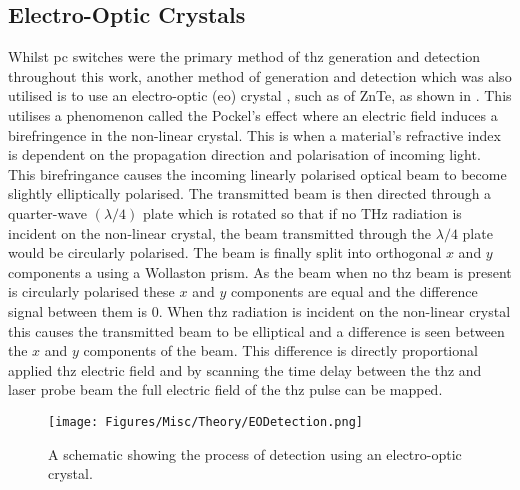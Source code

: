 \subsection{Electro-Optic Crystals}
Whilst \acrshort{pc} switches were the primary method of \acrshort{thz} generation and detection throughout this work, 
another method of generation and detection which was also utilised is to use an electro\nobreakdash-optic (\acrshort{eo}) crystal \DIFdelbegin \DIFdel{~}\DIFdelend \cite{Wu1995}, such as of ZnTe, as shown in . This utilises a phenomenon called the Pockel’s effect \DIFdelbegin \DIFdel{~}\DIFdelend \cite{vanderValk} where an electric field induces a birefringence in the non\nobreakdash-linear crystal. This is when a material's refractive index is dependent on the propagation direction and polarisation of incoming light. This birefringance causes the incoming linearly polarised optical beam to become slightly elliptically polarised. The transmitted beam is then directed through a quarter\nobreakdash-wave \((\lambda/4)\) plate which is rotated so that if no THz radiation is incident on the non\nobreakdash-linear crystal, the beam transmitted through the \(\lambda/4\) plate would be circularly polarised. The beam is \DIFdelbegin {}\DIFdelend \DIFaddbegin {}\DIFaddend finally split into orthogonal \(x\) and \(y\) components a using a Wollaston prism. As the beam when no \acrshort{thz} beam is present is circularly polarised these \(x\) and \(y\) components are equal and the difference signal between them is 0. When \acrshort{thz} radiation is incident on the non\nobreakdash-linear crystal this causes the transmitted beam to be elliptical and a difference is seen between the \(x\) and \(y\) components of the beam. This difference is directly proportional \DIFdelbegin {}\DIFdelend \DIFaddbegin {}\DIFaddend applied \acrshort{thz} electric field and by scanning the time delay between the \acrshort{thz} and laser probe beam the full electric field of the \acrshort{thz} pulse can be mapped. 

\begin{figure}[b]
    \centering
    \texttt{[image: Figures/Misc/Theory/EODetection.png]}
    \captionsetup{font = footnotesize, justification = centering}
    \caption[A Schematic showing the Process of Detection using an Electro-Optic Crystal]{A schematic showing the process of detection using an electro-optic crystal.}
    \label{fig:EO_Detection}
\end{figure}

